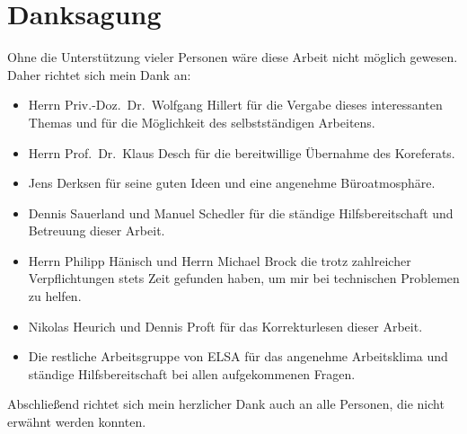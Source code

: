 \chapter*{Danksagung}
\label{sec:danksagung}
Ohne die Unterstützung vieler Personen wäre diese Arbeit nicht möglich gewesen.
Daher richtet sich mein Dank an:
\begin{itemize}
	\item Herrn Priv.-Doz.\ Dr.\ Wolfgang Hillert für die Vergabe dieses interessanten Themas und für die Möglichkeit des selbstständigen Arbeitens.
	
	\item Herrn Prof.\ Dr.\ Klaus Desch für die bereitwillige Übernahme des Koreferats.
	
	\item Jens Derksen für seine guten Ideen und eine angenehme Büroatmosphäre.
	
	\item Dennis Sauerland und Manuel Schedler für die ständige Hilfsbereitschaft und Betreuung dieser Arbeit.
	
	\item Herrn Philipp Hänisch und Herrn Michael Brock die trotz zahlreicher Verpflichtungen stets Zeit gefunden haben, um mir bei technischen Problemen zu helfen.
	
	\item Nikolas Heurich und Dennis Proft für das Korrekturlesen dieser Arbeit.
	
	\item Die restliche Arbeitsgruppe von ELSA für das angenehme Arbeitsklima und ständige Hilfsbereitschaft bei allen aufgekommenen Fragen.
\end{itemize}
Abschließend richtet sich mein herzlicher Dank auch an alle Personen, die nicht erwähnt werden konnten.